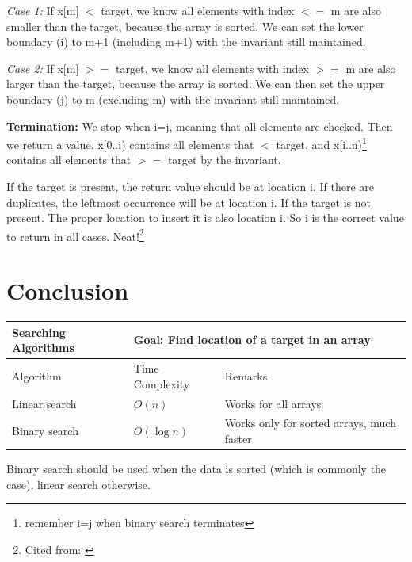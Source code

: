 \textit{Case 1:} If x[m] $<$ target, we know all elements with index $<=$ m are also smaller than the target, because the array is sorted. We can set the lower boundary (i) to m+1 (including m+1) with the invariant still maintained.

\textit{Case 2:} If x[m] $>=$ target, we know all elements with index $>=$ m are also larger than the target, because the array is sorted. We can then set the upper boundary (j) to m (excluding m) with the invariant still maintained.
\vspace{6mm}

\textbf{Termination:} We stop when i=j, meaning that all elements are checked. Then we return a value. x[0..i) contains all elements that $<$ target, and x[i..n)\footnote{remember i=j when binary search terminates} contains all elements that $>=$ target by the invariant. 

If the target is present, the return value should be at location i. If there are duplicates, the leftmost occurrence will be at location i. If the target is not present. The proper location to insert it is also location i. So i is the correct value to return in all cases. Neat!\footnote{Cited from: \cite{ip:binsearch}}

\vspace{6mm}

\fi

\section{Conclusion}

\begin{table}[h]
    \centering
    \begin{tabular}{|m{6em}|m{9em}|m{18em}|}
        \hline  
        \textbf{Searching Algorithms} & 
        \multicolumn{2}{l|}{Goal: Find location of a target in an array}
        \\ \hline \hline
        
        Algorithm &
        Time Complexity & 
        Remarks
        \\ \hline \hline
        
        Linear search &
        $O(n)$ &
        Works for all arrays
        \\ \hline
        
        Binary search &
        $O(\log n)$ &
        Works only for sorted arrays, much faster
        \\ \hline
    \end{tabular}
\end{table}

Binary search should be used when the data is sorted (which is commonly the case), linear search otherwise.